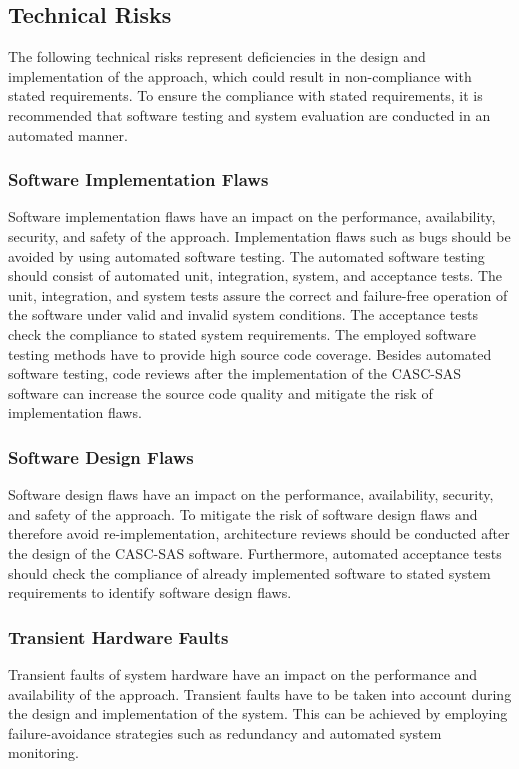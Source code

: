 \subsection{Technical Risks}
\label{sec:risk_assessment_technical}
The following technical risks represent deficiencies in the design and implementation of the approach, which could result in non-compliance with stated requirements.
To ensure the compliance with stated requirements, it is recommended that software testing and system evaluation are conducted in an automated manner.

\subsubsection{Software Implementation Flaws}
Software implementation flaws have an impact on the performance, availability, security, and safety of the approach.
Implementation flaws such as bugs should be avoided by using automated software testing.
The automated software testing should consist of automated unit, integration, system, and acceptance tests.
The unit, integration, and system tests assure the correct and failure-free operation of the software under valid and invalid system conditions.
The acceptance tests check the compliance to stated system requirements.
The employed software testing methods have to provide high source code coverage.
Besides automated software testing, code reviews after the implementation of the CASC-SAS software can increase the source code quality and mitigate the risk of implementation flaws.

\subsubsection{Software Design Flaws}
Software design flaws have an impact on the performance, availability, security, and safety of the approach.
To mitigate the risk of software design flaws and therefore avoid re-implementation, architecture reviews should be conducted after the design of the CASC-SAS software.
Furthermore, automated acceptance tests should check the compliance of already implemented software to stated system requirements to identify software design flaws.

\subsubsection{Transient Hardware Faults}
Transient faults of system hardware have an impact on the performance and availability of the approach.
Transient faults have to be taken into account during the design and implementation of the system.
This can be achieved by employing failure-avoidance strategies such as redundancy and automated system monitoring.

